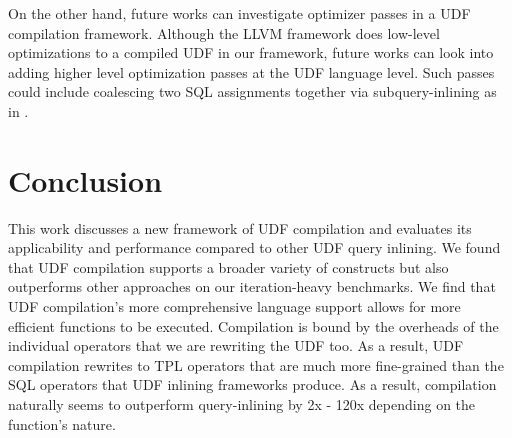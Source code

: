 \documentclass[12pt]{cmuthesis}
\begin{document}
On the other hand, future works can investigate optimizer passes in a UDF compilation framework. Although the LLVM framework does low-level optimizations to a compiled UDF in our framework, future works can look into adding higher level optimization passes at the UDF language level. Such passes could include coalescing two SQL assignments together via subquery-inlining as in \cite{Park19}.

\chapter{Conclusion}
\label{sec:conclusion}
This work discusses a new framework of UDF compilation and evaluates its applicability and performance compared to other UDF query inlining. We found that UDF compilation supports a broader variety of constructs but also outperforms other approaches on our iteration-heavy benchmarks. We find that UDF compilation's more comprehensive language support allows for more efficient functions to be executed. Compilation is bound by the overheads of the individual operators that we are rewriting the UDF too. As a result, UDF compilation rewrites to TPL operators that are much more fine-grained than the SQL operators that UDF inlining frameworks produce. As a result, compilation naturally seems to outperform query-inlining by 2x - 120x depending on the function's nature.\\


\newpage



\newpage
\end{document}
